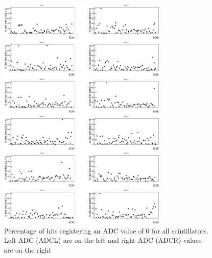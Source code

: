 \begin{figure}\begin{center}
    \includegraphics[width=0.75\textwidth]{figures/calib/tof/tofko/adc.eps}
    \caption{\label{plt:adc0vSCID}Percentage of hits registering an ADC value of 0 for all scintillators. Left ADC (ADCL) are on the left and right ADC (ADCR) values are on the right}
\end{center}\end{figure}

